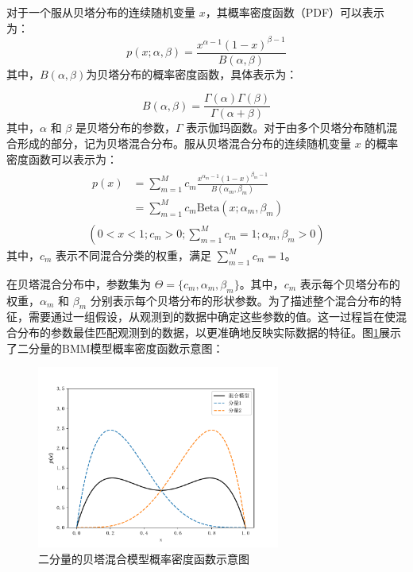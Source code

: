 对于一个服从贝塔分布的连续随机变量 $x$，其概率密度函数（PDF）可以表示为：
\begin{equation}
    \label{eq:beta1}
    p(x; \alpha, \beta) = \frac{x^{\alpha - 1} (1 - x)^{\beta - 1}}{B(\alpha, \beta)}
\end{equation}
其中，$B(\alpha, \beta)$为贝塔分布的概率密度函数，具体表示为：

\begin{equation}
    B(\alpha, \beta) = \frac{\Gamma(\alpha) \Gamma(\beta)}{\Gamma(\alpha + \beta)}
\end{equation}
其中，$\alpha$ 和 $\beta$ 是贝塔分布的参数，$\Gamma$ 表示伽玛函数。对于由多个贝塔分布随机混合形成的部分，记为贝塔混合分布。服从贝塔混合分布的连续随机变量 $x$ 的概率密度函数可以表示为：
\begin{equation}
    \label{eq:beta}
    \begin{gathered}
        \begin{aligned}
            p(x) & = \sum_{m=1}^M c_m \frac{x^{\alpha_m - 1} (1 - x)^{\beta_m - 1}}{B(\alpha_m, \beta_m)} \\
                 & = \sum_{m=1}^M c_m \text{Beta}(x; \alpha_m, \beta_m)
        \end{aligned}
        \\
        (0 < x < 1; c_m > 0; \sum_{m=1}^M c_m = 1; \alpha_m, \beta_m > 0)
    \end{gathered}
\end{equation}
其中，$c_m$ 表示不同混合分类的权重，满足 $\sum_{m=1}^M c_m=1$。

在贝塔混合分布中，参数集为 $\Theta = \{c_m, \alpha_m, \beta_m\}$。其中，$c_m$ 表示每个贝塔分布的权重，$\alpha_m$ 和 $\beta_m$ 分别表示每个贝塔分布的形状参数。为了描述整个混合分布的特征，需要通过一组假设，从观测到的数据中确定这些参数的值。这一过程旨在使混合分布的参数最佳匹配观测到的数据，以更准确地反映实际数据的特征。图\ref{BMM}展示了二分量的BMM模型概率密度函数示意图：
\begin{figure}[ht!]
    \centering
    \includegraphics[width=8cm]{pic/chapter4/BMM.pdf}
    \caption{二分量的贝塔混合模型概率密度函数示意图}
    \label{BMM}
\end{figure}

